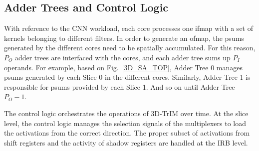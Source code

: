 \subsection{Adder Trees and Control Logic}

With reference to the CNN workload, each core processes one ifmap with a set of kernels belonging to different filters. In order to generate an ofmap, the psums generated by the different cores need to be spatially accumulated. For this reason, $P_O$ adder trees are interfaced with the cores, and each adder tree sums up $P_I$ operands. For example, based on Fig.~\ref{3D_SA_TOP}, Adder Tree 0 manages psums generated by each Slice 0 in the different cores. Similarly, Adder Tree 1 is responsible for psums provided by each Slice 1. And so on until Adder Tree $P_O-1$.

The control logic orchestrates the operations of 3D-TrIM over time. At the slice level, the control logic manages the selection signals of the multiplexers to load the activations from the correct direction. The proper subset of activations from shift registers and the activity of shadow registers are handled at the IRB level.
